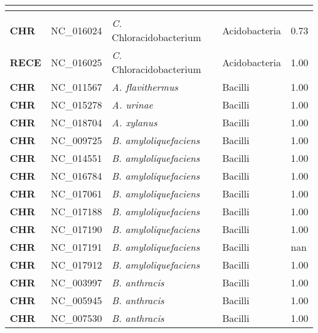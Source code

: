 \setlength{\columnsep}{5cm}
\begin{adjustwidth}{-3cm}{2cm}
\addtolength{\textheight}{5cm}
\addtolength{\voffset}{-1cm}

\begingroup
    \fontsize{8pt}{11pt}\selectfont
   { \tiny
\twocolumn
\begin{supertabular}{>{\bfseries}l|p{0.1\textwidth}p{0.14\textwidth}l|l}
\\
\hline\\
CHR & NC\_016024 & \textit{C. }Chloracidobacterium & Acidobacteria & 0.73\\
RECE & NC\_016025 & \textit{C.} Chloracidobacterium & Acidobacteria & 1.00\\
CHR & NC\_011567 & \textit{A. flavithermus} & Bacilli & 1.00\\
CHR & NC\_015278 & \textit{A. urinae} & Bacilli & 1.00\\
CHR & NC\_018704 & \textit{A. xylanus} & Bacilli & 1.00\\
CHR & NC\_009725 & \textit{B. amyloliquefaciens} & Bacilli & 1.00\\
CHR & NC\_014551 & \textit{B. amyloliquefaciens} & Bacilli & 1.00\\
CHR & NC\_016784 & \textit{B. amyloliquefaciens} & Bacilli & 1.00\\
CHR & NC\_017061 & \textit{B. amyloliquefaciens} & Bacilli & 1.00\\
CHR & NC\_017188 & \textit{B. amyloliquefaciens} & Bacilli & 1.00\\
CHR & NC\_017190 & \textit{B. amyloliquefaciens} & Bacilli & 1.00\\
CHR & NC\_017191 & \textit{B. amyloliquefaciens} & Bacilli & nan\\
CHR & NC\_017912 & \textit{B. amyloliquefaciens} & Bacilli & 1.00\\
CHR & NC\_003997 & \textit{B. anthracis} & Bacilli & 1.00\\
CHR & NC\_005945 & \textit{B. anthracis} & Bacilli & 1.00\\
CHR & NC\_007530 & \textit{B. anthracis} & Bacilli & 1.00\\

\end{supertabular}}
\end{adjustwidth}

